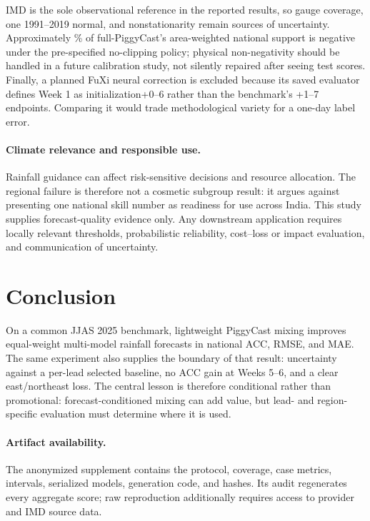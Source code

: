 \documentclass[10pt,twocolumn]{article}
\begin{document}
IMD is the sole observational reference in the reported results, so gauge
coverage, one 1991--2019 normal, and nonstationarity remain sources of
uncertainty. Approximately \FullNegativePercent{}\% of full-PiggyCast's
area-weighted national support is negative under the pre-specified no-clipping
policy;
physical non-negativity should be handled in a future calibration study, not
silently repaired after seeing test scores. Finally, a planned FuXi neural
correction is excluded because its saved evaluator defines Week 1 as
initialization+0--6 rather than the benchmark's +1--7 endpoints. Comparing it
would trade methodological variety for a one-day label error.

\paragraph{Climate relevance and responsible use.}
Rainfall guidance can affect risk-sensitive decisions and resource allocation.
The regional failure is therefore not a cosmetic subgroup result: it argues
against presenting one national skill number as readiness for use across
India. This study supplies forecast-quality evidence only. Any downstream
application requires locally relevant thresholds, probabilistic reliability,
cost--loss or impact evaluation, and communication of uncertainty.

\section{Conclusion}

On a common JJAS 2025 benchmark, lightweight PiggyCast mixing improves
equal-weight multi-model rainfall forecasts in national ACC, RMSE, and MAE.
The same experiment also supplies the boundary of that result: uncertainty
against a per-lead selected baseline, no ACC gain at Weeks 5--6, and a clear
east/northeast loss. The central lesson is therefore conditional rather than
promotional: forecast-conditioned mixing can add value, but lead- and
region-specific evaluation must determine where it is used.

\paragraph{Artifact availability.}
The anonymized supplement contains the protocol, coverage, case metrics,
intervals, serialized models, generation code, and hashes. Its audit
regenerates every aggregate score; raw reproduction additionally requires
access to provider and IMD source data.

\clearpage



\appendix

\end{document}
